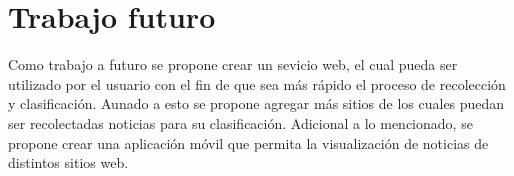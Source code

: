 \section{Trabajo futuro}
Como trabajo a futuro se propone crear un sevicio web, el cual pueda ser utilizado por el usuario con el fin de que sea más rápido el proceso de recolección y clasificación. Aunado a esto se propone agregar más sitios de los cuales puedan ser recolectadas noticias para su clasificación. Adicional a lo mencionado, se propone crear una aplicación móvil que permita la visualización de noticias de distintos sitios web.
